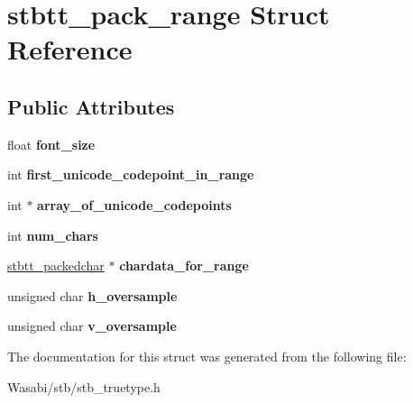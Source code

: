 \hypertarget{structstbtt__pack__range}{}\section{stbtt\+\_\+pack\+\_\+range Struct Reference}
\label{structstbtt__pack__range}
\subsection*{Public Attributes}
\begin{DoxyCompactItemize}
\item 
float {\bfseries font\+\_\+size}\hypertarget{structstbtt__pack__range_a296916dc971e5e7627822fe98dc42828}{}\label{structstbtt__pack__range_a296916dc971e5e7627822fe98dc42828}

\item 
int {\bfseries first\+\_\+unicode\+\_\+codepoint\+\_\+in\+\_\+range}\hypertarget{structstbtt__pack__range_a3b414cbee1e164c29dd138e0ae3d5759}{}\label{structstbtt__pack__range_a3b414cbee1e164c29dd138e0ae3d5759}

\item 
int $\ast$ {\bfseries array\+\_\+of\+\_\+unicode\+\_\+codepoints}\hypertarget{structstbtt__pack__range_a1567aa5455e1251529a91b46261368cf}{}\label{structstbtt__pack__range_a1567aa5455e1251529a91b46261368cf}

\item 
int {\bfseries num\+\_\+chars}\hypertarget{structstbtt__pack__range_a046d65b6ffb65fb998d471ba098e2e23}{}\label{structstbtt__pack__range_a046d65b6ffb65fb998d471ba098e2e23}

\item 
\hyperlink{structstbtt__packedchar}{stbtt\+\_\+packedchar} $\ast$ {\bfseries chardata\+\_\+for\+\_\+range}\hypertarget{structstbtt__pack__range_aa8f7ddd637ed341ea39b08466fab9284}{}\label{structstbtt__pack__range_aa8f7ddd637ed341ea39b08466fab9284}

\item 
unsigned char {\bfseries h\+\_\+oversample}\hypertarget{structstbtt__pack__range_a7a642139ce446c58fde5c48553bcf008}{}\label{structstbtt__pack__range_a7a642139ce446c58fde5c48553bcf008}

\item 
unsigned char {\bfseries v\+\_\+oversample}\hypertarget{structstbtt__pack__range_a6288f14006e257544db3d015c32b4113}{}\label{structstbtt__pack__range_a6288f14006e257544db3d015c32b4113}

\end{DoxyCompactItemize}


The documentation for this struct was generated from the following file\+:\begin{DoxyCompactItemize}
\item 
Wasabi/stb/stb\+\_\+truetype.\+h\end{DoxyCompactItemize}
